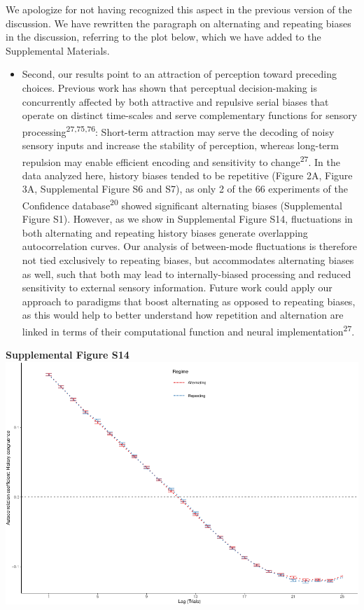 \documentclass[
]{article}
\providecommand{\tightlist}{%
  \setlength{\itemsep}{0pt}\setlength{\parskip}{0pt}}
\begin{document}
We apologize for not having recognized this aspect in the previous
version of the discussion. We have rewritten the paragraph on
alternating and repeating biases in the discussion, referring to the
plot below, which we have added to the Supplemental Materials.

\begin{itemize}
\tightlist
\item
  Second, our results point to an attraction of perception toward
  preceding choices. Previous work has shown that perceptual
  decision-making is concurrently affected by both attractive and
  repulsive serial biases that operate on distinct time-scales and serve
  complementary functions for sensory
  processing\textsuperscript{27,75,76}: Short-term attraction may serve
  the decoding of noisy sensory inputs and increase the stability of
  perception, whereas long-term repulsion may enable efficient encoding
  and sensitivity to change\textsuperscript{27}. In the data analyzed
  here, history biases tended to be repetitive (Figure 2A, Figure 3A,
  Supplemental Figure S6 and S7), as only 2 of the 66 experiments of the
  Confidence database\textsuperscript{20} showed significant alternating
  biases (Supplemental Figure S1). However, as we show in Supplemental
  Figure S14, fluctuations in both alternating and repeating history
  biases generate overlapping autocorrelation curves. Our analysis of
  between-mode fluctuations is therefore not tied exclusively to
  repeating biases, but accommodates alternating biases as well, such
  that both may lead to internally-biased processing and reduced
  sensitivity to external sensory information. Future work could apply
  our approach to paradigms that boost alternating as opposed to
  repeating biases, as this would help to better understand how
  repetition and alternation are linked in terms of their computational
  function and neural implementation\textsuperscript{27}.
\end{itemize}

\textbf{Supplemental Figure S14}
\includegraphics{modes_mouse_rev1b_files/figure-latex/Supplemental_Figure_S14_print-1.pdf}
\end{document}
